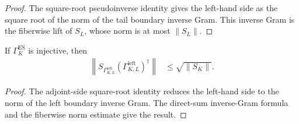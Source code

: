 \begin{proof}
    \leanok
    The square-root pseudoinverse identity gives the left-hand side as the
    square root of the norm of the tail boundary inverse Gram.  This inverse
    Gram is the fiberwise lift of $S_L$, whose norm is at most
    $\lVert S_L\rVert$.
\end{proof}

\begin{lemma}
    \label{thm:left_spectator_pseudoinverse_bound}
    \leanok
    If $\Gamma_K^{\mathrm{ES}}$ is injective, then
    \begin{align}
        \left\lVert S_{\Gamma_{K,L}^{\mathrm{left}}}
        (\Gamma_{K,L}^{\mathrm{left}})^\dagger\right\rVert
         & \leq\sqrt{\lVert S_K\rVert}.
    \end{align}
\end{lemma}

\begin{proof}
    \leanok
    The adjoint-side square-root identity reduces the left-hand side to the
    norm of the left boundary inverse Gram.  The direct-sum inverse-Gram formula
    and the fiberwise norm estimate give the result.
\end{proof}

